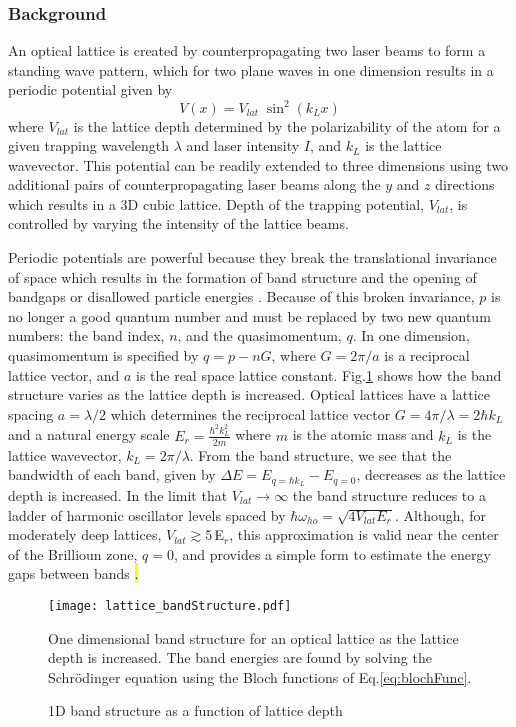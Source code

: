 \subsubsection{Background} \label{sec:latBackground}
An optical lattice is created by counterpropagating two laser beams to form a standing wave pattern, which for two plane waves in one dimension results in a periodic potential given by 
	\begin{equation}
		 V(x) = V_{lat} \; \sin^2(k_L x)
	\end{equation}
where $V_{lat}$ is the lattice depth determined by the polarizability of the atom for a given trapping wavelength $\lambda$ and laser intensity $I$, and $k_L$ is the lattice wavevector.
This potential can be readily extended to three dimensions using two additional pairs of counterpropagating laser beams along the $y$ and $z$ directions which results in a 3D cubic lattice.
Depth of the trapping potential, $V_{lat}$, is controlled by varying the intensity of the lattice beams.

Periodic potentials are powerful because they break the translational invariance of space which results in the formation of band structure and the opening of bandgaps or disallowed particle energies \cite{Ashcroft1976}.
Because of this broken invariance, $p$ is no longer a good quantum number and must be replaced by two new quantum numbers: the band index, $n$, and the quasimomentum, $q$.
In one dimension, quasimomentum is specified by $q = p - nG$, where $G=2\pi/a$ is a reciprocal lattice vector, and $a$ is the real space lattice constant.
Fig.\;\ref{fig:bandStructure} shows how the band structure varies as the lattice depth is increased.
Optical lattices have a lattice spacing $a = \lambda /2$ which determines the reciprocal lattice vector $G = 4\pi / \lambda = 2 \hbar k_L$ and a natural energy scale $E_r = \frac{\hbar^2 k_L^2}{2m}$ where $m$ is the atomic mass and $k_L$ is the lattice wavevector, $k_L = 2\pi / \lambda$.
From the band structure, we see that the bandwidth of each band, given by $\Delta E = E_{q=\hbar k_L} - E_{q=0}$, decreases as the lattice depth is increased.
In the limit that $V_{lat}\!\rightarrow\!\infty$ the band structure reduces to a ladder of harmonic oscillator levels spaced by $\hbar \omega_{ho} = \sqrt{4 V_{lat} E_r}$.
Although, for moderately deep lattices, $V_{lat} \gtrsim 5\,$E$_r$, this approximation is valid near the center of the Brillioun zone, $q = 0$, and provides a simple form to estimate the energy gaps between bands \hl{\cite{Jaksch1998,Jaksch2005}.}
	\begin{figure} \label{fig:bandStructure}
		\centerline{
		\texttt{[image: lattice\_bandStructure.pdf]}}
		\caption{1D band structure as a function of lattice depth}{One dimensional band structure for an optical lattice as the lattice depth is increased. The band energies are found by solving the Schr\"{o}dinger equation using the Bloch functions of Eq.\;\ref{eq:blochFunc}.}
	\end{figure}

